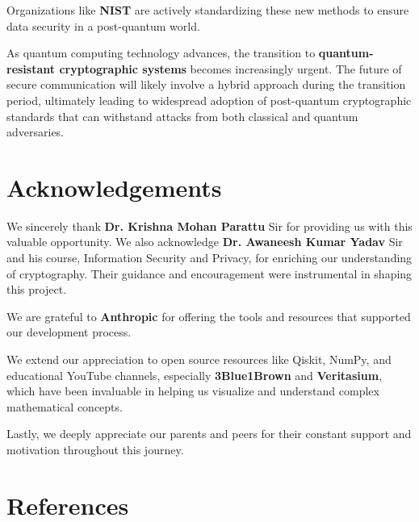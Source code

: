 \documentclass{article}
\begin{document}
\begin{infobox}[title=Summary of Findings]
    Organizations like \textbf{NIST} are actively standardizing these new methods to ensure data security in a post-quantum world.

    As quantum computing technology advances, the transition to \textbf{quantum-resistant cryptographic systems} becomes increasingly urgent. The future of secure communication will likely involve a hybrid approach during the transition period, ultimately leading to widespread adoption of post-quantum cryptographic standards that can withstand attacks from both classical and quantum adversaries.
\end{infobox}

\newpage
\section{Acknowledgements}

We sincerely thank \textbf{Dr. Krishna Mohan Parattu} Sir for providing us with this valuable opportunity. We also acknowledge \textbf{Dr. Awaneesh Kumar Yadav} Sir and his course, Information Security and Privacy, for enriching our understanding of cryptography. Their guidance and encouragement were instrumental in shaping this project.

We are grateful to \textbf{Anthropic} for offering the tools and resources that supported our development process.

We extend our appreciation to open source resources like Qiskit, NumPy, and educational YouTube channels, especially \textbf{3Blue1Brown} and \textbf{Veritasium}, which have been invaluable in helping us visualize and understand complex mathematical concepts.

Lastly, we deeply appreciate our parents and peers for their constant support and motivation throughout this journey.

\newpage
\section{References}
\end{document}
